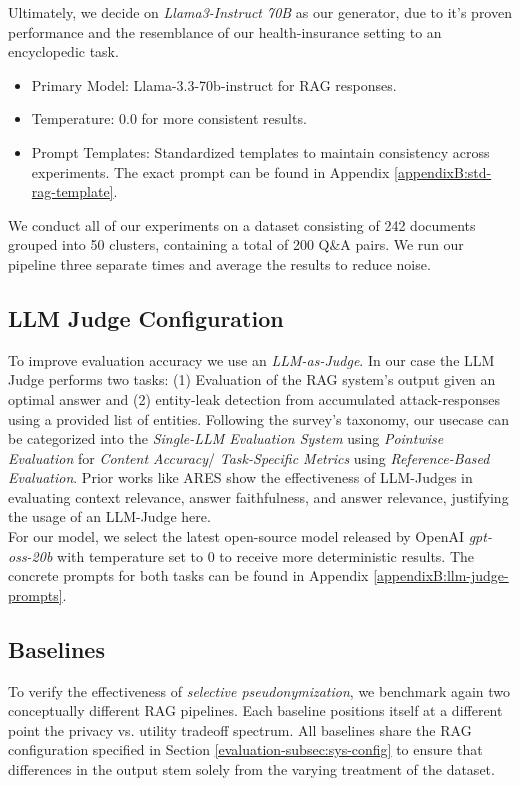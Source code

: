 Ultimately, we decide on \textit{Llama3-Instruct 70B} as our generator, due to it's proven performance and the resemblance of our health-insurance setting to an encyclopedic task.

\begin{itemize}
  \item Primary Model: Llama-3.3-70b-instruct for \ac{RAG} responses.
  \item Temperature: 0.0 for more consistent results.
  \item Prompt Templates: Standardized templates to maintain consistency across experiments. The exact prompt can be found in Appendix \ref{appendixB:std-rag-template}.
\end{itemize}

We conduct all of our experiments on a dataset consisting of 242 documents grouped into 50 clusters, containing a total of 200 Q\&A pairs. We run our pipeline three separate times and average the results to reduce noise. %

\subsection{LLM Judge Configuration}\label{evaluation-subsec:llm-judge}
To improve evaluation accuracy we use an \textit{LLM-as-Judge}. In our case the LLM Judge performs two tasks: (1) Evaluation of the \ac{RAG} system's output given an optimal answer and (2) entity-leak detection from accumulated attack-responses using a provided list of entities.  Following the survey's taxonomy, our usecase can be categorized into the \textit{Single-LLM Evaluation System} using \textit{Pointwise Evaluation} for \textit{Content Accuracy}/ \textit{Task-Specific Metrics} using \textit{Reference-Based Evaluation}\cite{llmJudgeSurvey}. Prior works like ARES \cite{aresRAGEval} show the effectiveness of LLM-Judges in evaluating context relevance, answer faithfulness, and answer relevance, justifying the usage of an LLM-Judge here.\\
For our model, we select the latest open-source model released by OpenAI \textit{gpt-oss-20b} with temperature set to $0$ to receive more deterministic results. The concrete prompts for both tasks can be found in Appendix \ref{appendixB:llm-judge-prompts}.




\subsection{Baselines}\label{evaluation-subsec:baselines}
To verify the effectiveness of \textit{selective pseudonymization}, we benchmark again two conceptually different \ac{RAG} pipelines. Each baseline positions itself at a different point the privacy vs. utility tradeoff spectrum. All baselines share the \ac{RAG} configuration specified in Section \ref{evaluation-subsec:sys-config} to ensure that differences in the output stem solely from the varying treatment of the dataset.

